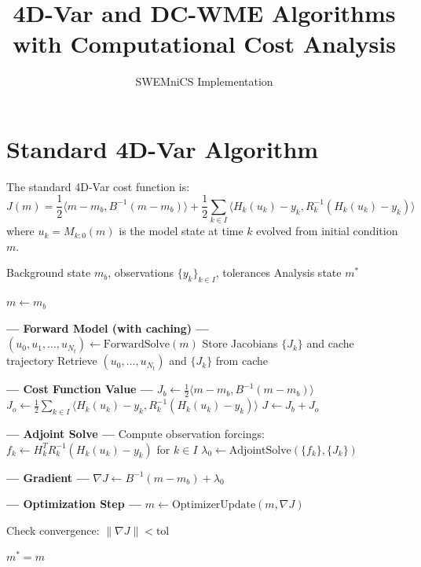\documentclass[11pt]{article}
\title{4D-Var and DC-WME Algorithms with Computational Cost Analysis}
\author{SWEMniCS Implementation}
\date{}
\newcommand{\mb}{m_b}
\newcommand{\Binv}{B^{-1}}
\newcommand{\Rinv}{R^{-1}}
\begin{document}
\maketitle

\section{Standard 4D-Var Algorithm}

The standard 4D-Var cost function is:
\begin{equation}
J(m) = \frac{1}{2}\langle m - \mb, \Binv(m - \mb)\rangle
     + \frac{1}{2}\sum_{k \in I} \langle H_k(u_k) - y_k, \Rinv_k(H_k(u_k) - y_k)\rangle
\end{equation}
where $u_k = M_{k:0}(m)$ is the model state at time $k$ evolved from initial condition $m$.

\begin{algorithm}[H]
\caption{Standard 4D-Var}
\label{alg:4dvar}
\begin{algorithmic}[1]
\Require Background state $\mb$, observations $\{y_k\}_{k \in I}$, tolerances
\Ensure Analysis state $m^*$

\State $m \gets \mb$ 


    \State \textbf{--- Forward Model (with caching) ---}
        \State $(u_0, u_1, \ldots, u_{N_t}) \gets \text{ForwardSolve}(m)$ \Comment{\textcolor{blue}{Cost: 1 forward solve}}
        \State Store Jacobians $\{J_k\}$ and cache trajectory
    \Else
        \State Retrieve $(u_0, \ldots, u_{N_t})$ and $\{J_k\}$ from cache 
    \EndIf

    \State \textbf{--- Cost Function Value ---} 
    \State $J_b \gets \frac{1}{2}\langle m - \mb, \Binv(m - \mb)\rangle$
    \State $J_o \gets \frac{1}{2}\sum_{k \in I} \langle H_k(u_k) - y_k, \Rinv_k(H_k(u_k) - y_k)\rangle$
    \State $J \gets J_b + J_o$

    \State \textbf{--- Adjoint Solve ---} 
    \State Compute observation forcings: $f_k \gets H_k^T \Rinv_k (H_k(u_k) - y_k)$ for $k \in I$
    \State $\lambda_0 \gets \text{AdjointSolve}(\{f_k\}, \{J_k\})$ 

    \State \textbf{--- Gradient ---} 
    \State $\nabla J \gets \Binv(m - \mb) + \lambda_0$

    \State \textbf{--- Optimization Step ---} 
    \State $m \gets \text{OptimizerUpdate}(m, \nabla J)$

    \State Check convergence: $\|\nabla J\| < \text{tol}$

\EndWhile

\State \Return $m^* = m$

\end{algorithmic}
\end{algorithm}
\end{document}
